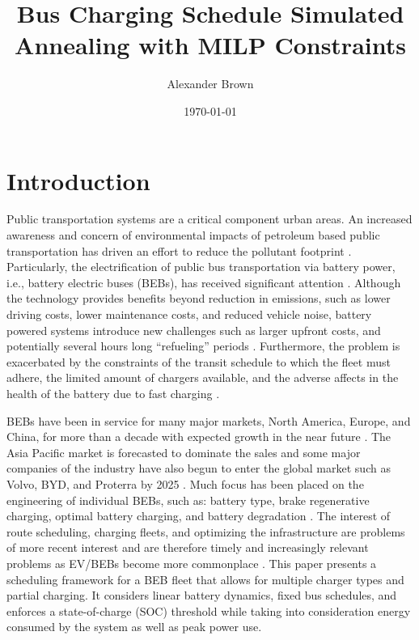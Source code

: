 \documentclass[11pt,a4paper,final]{article}
\author{Alexander Brown}
\date{\today}
\title{Bus Charging Schedule Simulated Annealing with MILP Constraints}
\begin{document}
\maketitle
\tableofcontents

\parskip 3mm                                %
\let\ref\autoref                            %

\section{Introduction}
\label{sec:introduction}
Public transportation systems are a critical component urban areas. An increased awareness and concern of environmental
impacts of petroleum based public transportation has driven an effort to reduce the pollutant footprint
\cite{de-2014-simul-elect,xylia-2018-role-charg,guida-2017-zeeus-repor-europ,li-2016-batter-elect}. Particularly,
the electrification of public bus transportation via battery power, i.e., battery electric buses (BEBs), has received
significant attention \cite{li-2016-batter-elect}. Although the technology provides benefits beyond reduction in
emissions, such as lower driving costs, lower maintenance costs, and reduced vehicle noise, battery powered systems
introduce new challenges such as larger upfront costs, and potentially several hours long ``refueling'' periods
\cite{xylia-2018-role-charg,li-2016-batter-elect}. Furthermore, the problem is exacerbated by the constraints of the
transit schedule to which the fleet must adhere, the limited amount of chargers available, and the adverse affects in
the health of the battery due to fast charging \cite{lutsey-2019-updat-elect}.

BEBs have been in service for many major markets, North America, Europe, and China, for more than a decade with expected
growth in the near future \cite{deng-2021-survey-elect}. The Asia Pacific market is forecasted to dominate the sales
and some major companies of the industry have also begun to enter the global market such as Volvo, BYD, and Proterra by
2025 \cite{deng-2021-survey-elect}. Much focus has been placed on the engineering of individual BEBs, such as: battery
type, brake regenerative charging, optimal battery charging, and battery degradation \cite{chen-2008-desig-grey,abdollahi-2016-optim-batter,kuhne-2010-elect,deng-2021-survey-elect}. The interest of route scheduling, charging
fleets, and optimizing the infrastructure are problems of more recent interest and are therefore timely and increasingly
relevant problems as EV/BEBs become more commonplace \cite{hoke-2014-accoun-lithium,sebastiani-2016-evaluat-elect,wei-2018-optim-spatio}. This paper presents a scheduling framework for a BEB fleet that allows for multiple charger
types and partial charging. It considers linear battery dynamics, fixed bus schedules, and enforces a state-of-charge
(SOC) threshold while taking into consideration energy consumed by the system as well as peak power use.
\end{document}
